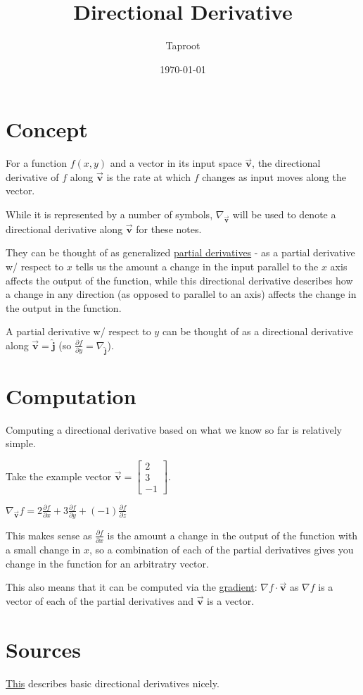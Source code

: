 \documentclass[letterpaper]{article}
\author{Taproot}
\date{\today}
\title{Directional Derivative}
\renewcommand{\tableofcontents}{}
\begin{document}
\tableofcontents


\section{Concept}
\label{sec:orge1c70f0}
For a function \(f(x,y)\) and a vector in its input space \(\vec{\textbf{v}}\), the directional derivative of \(f\) along \(\vec{\mathbf{v}}\) is the rate at which \(f\) changes as input moves along the vector. 

While it is represented by a number of symbols, \(\nabla_{\vec{\textbf{v}}}\) will be used to denote a directional derivative along \(\vec{\textbf{v}}\) for these notes.

They can be thought of as generalized \href{partial-derivatives.org}{partial derivatives} - as a partial derivative w/ respect to \(x\) tells us the amount a change in the input parallel to the \(x\) axis affects the output of the function, while this directional derivative describes how a change in any direction (as opposed to parallel to an axis) affects the change in the output in the function. 

\begin{note}
A partial derivative w/ respect to \(y\) can be thought of as a directional derivative along \(\vec{\mathbf{v}} = \widehat{\mathbf{j}}\) (so \(\frac{\partial f}{\partial y} = \nabla_{\widehat{\mathbf{j}}}\)).
\end{note}

\section{Computation}
\label{sec:org8ce978d}

Computing a directional derivative based on what we know so far is relatively simple. 

Take the example vector \(\vec{\mathbf{v}} = \left[\begin{matrix}2 \\ 3 \\ -1 \end{matrix}\right]\).

\(\nabla_{\vec{\textbf{v}}} f = 2\frac{\partial f}{\partial x} + 3\frac{\partial f}{\partial y} + (-1)\frac{\partial f}{\partial z}\)

This makes sense as \(\frac{\partial f}{\partial x}\) is the amount a change in the output of the function with a small change in \(x\), so a combination of each of the partial derivatives gives you change in the function for an arbitratry vector.

This also means that it can be computed via the \href{20200830000157-gradients.org}{gradient}: \(\nabla f \cdot \vec{\textbf{v}}\) as \(\nabla f\) is a vector of each of the partial derivatives and \(\vec{\textbf{v}}\) is a vector.

\section{Sources}
\label{sec:org98ee2b0}
\href{https://www.khanacademy.org/math/multivariable-calculus/multivariable-derivatives/partial-derivative-and-gradient-articles/a/directional-derivative-introduction}{This} describes basic directional derivatives nicely.
\end{document}
